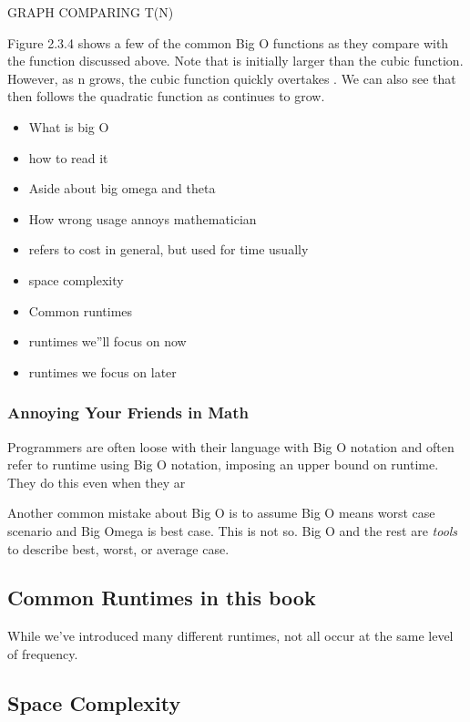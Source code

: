 GRAPH COMPARING T(N)

Figure 2.3.4 shows a few of the common Big O functions as they compare with the function discussed above. Note that is initially larger than the cubic function. However, as n grows, the cubic function quickly overtakes . We can also see that then follows the quadratic function as continues to grow.

\begin{itemize}
	\item What is big O
	
	\item  how to read it
	\item Aside about big omega and theta
	\item How wrong usage annoys mathematician
	\item refers to cost in general, but used for time usually
	\item  space complexity 
	\item Common runtimes
	\item runtimes we''ll focus on now
	\item runtimes we focus on later
\end{itemize}

\subsubsection{Annoying Your Friends in Math}

Programmers are often loose with their language with Big O notation and often refer to runtime using Big O notation, imposing an upper bound on runtime.  They do this even when they ar

Another common mistake about Big O is to assume Big O means worst case scenario and Big Omega is best case.  This is not so.  Big O and the rest are \emph{tools} to describe best, worst, or average case.

\subsection{Common Runtimes in this book}
While we've introduced many different runtimes, not all occur at the same level of frequency.





\subsection{Space Complexity}





